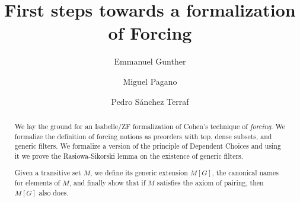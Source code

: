 \documentclass{article}
\begin{document}
\title{First steps towards a formalization of Forcing}
\author{Emmanuel Gunther
  \and 
  Miguel Pagano
  \and 
  Pedro S\'anchez Terraf}
\maketitle

\begin{abstract} 
  We lay the ground for an Isabelle/ZF formalization of Cohen's technique of
  \emph{forcing}. We formalize the definition of forcing notions as
  preorders with top, dense subsets, and generic filters. We formalize
  a version of the principle of Dependent Choices and using it
  we prove the Rasiowa-Sikorski lemma on the existence of generic filters.
  
  Given a transitive set $M$, we define its generic extension $M[G]$,
  the canonical names for elements of $M$, and finally show that if $M$
  satisfies the axiom of pairing, then $M[G]$ also does.
\end{abstract}




















%
%

\end{document}
